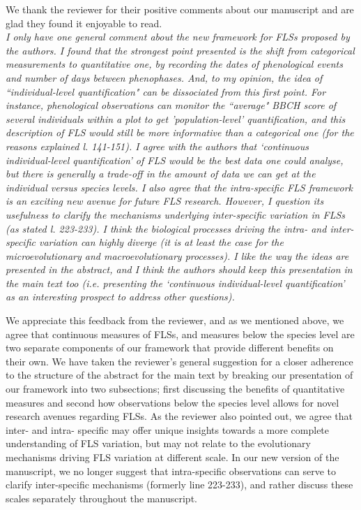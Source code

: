 \documentclass{article}[11pt]
\begin{document}
\noindent We thank the reviewer for their positive comments about our manuscript and are glad they found it enjoyable to read.\\

\emph{I only have one general comment about the new framework for FLSs proposed by the authors. I found that the strongest point presented is the shift from categorical measurements to quantitative one, by recording the dates of phenological events and number of days between phenophases. And, to my opinion, the idea of ``individual-level quantification" can be dissociated from this first point. For instance, phenological observations can monitor the ``average" BBCH score of several individuals within a plot to get 'population-level' quantification, and this description of FLS would still be more informative than a categorical one (for the reasons explained l. 141-151). I agree with the authors that `continuous individual-level quantification' of FLS would be the best data one could analyse, but there is generally a trade-off in the amount of data we can get at the individual versus species levels. I also agree that the intra-specific FLS framework is an exciting new avenue for future FLS research. However, I question its usefulness to clarify the mechanisms underlying inter-specific variation in FLSs (as stated l. 223-233). I think the biological processes driving the intra- and inter-specific variation can highly diverge (it is at least the case for the microevolutionary and macroevolutionary processes). I like the way the ideas are presented in the abstract, and I think the authors should keep this presentation in the main text too (i.e. presenting the  `continuous individual-level quantification' as an interesting prospect to address other questions).}

\noident We appreciate this feedback from the reviewer, and as we mentioned above, we agree that continuous measures of FLSs, and measures below the species level are two separate components of our framework that provide different benefits on their own. We have taken the reviewer's general suggestion for a closer adherence to the structure of the abstract for the main text by breaking our presentation of our framework into two subsections; first discussing the benefits of quantitative measures and second how observations below the species level allows for novel research avenues regarding FLSs. As the reviewer also pointed out, we agree that inter- and intra- specific may offer unique insights towards a more complete understanding of FLS variation, but may not relate to the evolutionary mechanisms driving FLS variation at different scale. In our new version of the manuscript, we no longer suggest that intra-specific observations can serve to clarify inter-specific mechanisms (formerly line 223-233), and rather discuss these scales separately throughout the manuscript.\\
\end{document}
